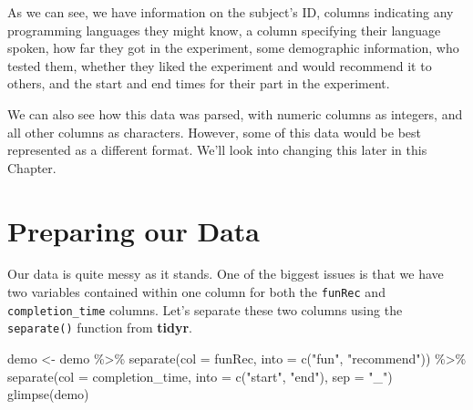 \documentclass[
]{book}
\newenvironment{Shaded}{\begin{snugshade}}{\end{snugshade}}
\newcommand{\AttributeTok}[1]{\textcolor[rgb]{0.77,0.63,0.00}{#1}}
\newcommand{\FunctionTok}[1]{\textcolor[rgb]{0.00,0.00,0.00}{#1}}
\newcommand{\NormalTok}[1]{#1}
\newcommand{\OtherTok}[1]{\textcolor[rgb]{0.56,0.35,0.01}{#1}}
\newcommand{\SpecialCharTok}[1]{\textcolor[rgb]{0.00,0.00,0.00}{#1}}
\newcommand{\StringTok}[1]{\textcolor[rgb]{0.31,0.60,0.02}{#1}}
\begin{document}
As we can see, we have information on the subject's ID, columns indicating any programming languages they might know, a column specifying their language spoken, how far they got in the experiment, some demographic information, who tested them, whether they liked the experiment and would recommend it to others, and the start and end times for their part in the experiment.

We can also see how this data was parsed, with numeric columns as integers, and all other columns as characters. However, some of this data would be best represented as a different format. We'll look into changing this later in this Chapter.

\hypertarget{preparing-our-data}{%
\section{Preparing our Data}\label{preparing-our-data}}

Our data is quite messy as it stands. One of the biggest issues is that we have two variables contained within one column for both the \texttt{funRec} and \texttt{completion\_time} columns. Let's separate these two columns using the \texttt{separate()} function from \textbf{tidyr}.

\begin{Shaded}
\begin{Highlighting}[]
\NormalTok{demo }\OtherTok{\textless{}{-}}\NormalTok{ demo }\SpecialCharTok{\%\textgreater{}\%}
  \FunctionTok{separate}\NormalTok{(}\AttributeTok{col =}\NormalTok{ funRec, }\AttributeTok{into =} \FunctionTok{c}\NormalTok{(}\StringTok{"fun"}\NormalTok{, }\StringTok{"recommend"}\NormalTok{)) }\SpecialCharTok{\%\textgreater{}\%}
  \FunctionTok{separate}\NormalTok{(}\AttributeTok{col =}\NormalTok{ completion\_time, }\AttributeTok{into =} \FunctionTok{c}\NormalTok{(}\StringTok{"start"}\NormalTok{, }\StringTok{"end"}\NormalTok{), }\AttributeTok{sep =} \StringTok{"\_"}\NormalTok{)}
\FunctionTok{glimpse}\NormalTok{(demo)}
\end{Highlighting}
\end{Shaded}
\end{document}
